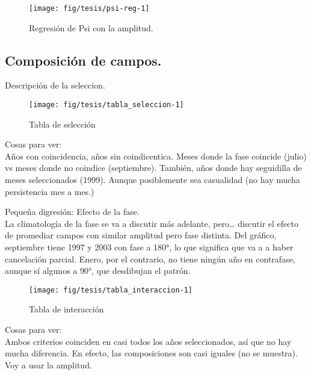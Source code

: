 \documentclass[spanish,a4paper]{book}
\begin{document}
\begin{figure}

{\centering \texttt{[image: fig/tesis/psi-reg-1]} 

}

\caption{Regresión de Psi con la amplitud.}\label{fig:psi-reg}
\end{figure}

\subsection{Composición de campos.}\label{composicion-de-campos.}

Descripción de la seleccion.

\begin{figure}

{\centering \texttt{[image: fig/tesis/tabla\_seleccion-1]} 

}

\caption{Tabla de selección}\label{fig:tabla_seleccion}
\end{figure}

Cosas para ver:\\
Años con coincidencia, años sin coindicentica. Meses donde la fase
coincide (julio) vs meses donde no coindice (septiembre). También, años
donde hay seguidilla de meses seleccionados (1999). Aunque posiblemente
sea casualidad (no hay mucha persistencia mes a mes.)

Pequeña digresión: Efecto de la fase.\\
La climatología de la fase se va a discutir más adelante, pero\ldots{}
discutir el efecto de promediar campos con similar amplitud pero fase
distinta. Del gráfico, septiembre tiene 1997 y 2003 con fase a 180°, lo
que significa que va a a haber cancelación parcial. Enero, por el
contrario, no tiene ningún año en contrafase, aunque sí algunos a 90°,
que desdibujan el patrón.

\begin{figure}

{\centering \texttt{[image: fig/tesis/tabla\_interaccion-1]} 

}

\caption{Tabla de interacción}\label{fig:tabla_interaccion}
\end{figure}

Cosas para ver:\\
Ambos criterios coinciden en casi todos los años seleccionados, así que
no hay mucha diferencia. En efecto, las composiciones son casi iguales
(no se muestra). Voy a usar la amplitud.
\end{document}
